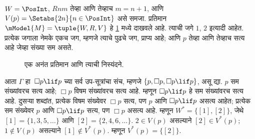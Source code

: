 \begin{ex}
  $W = \PosInt$, $Rnm$ तेव्हा आणि तेव्हाच $m = n + 1$,
  आणि $V(p) = \Setabs{2n}{n \in
    \PosInt}$ असे समजा. प्रतिमान~$\mModel{M} = \tuple{W, R, V}$
  हे \ref{nml:fil:exf:fig:ex-filtration} मध्ये दाखवले आहे.
  त्याची जगे $1$, $2$ इत्यादी आहेत. प्रत्येक जगाला
  नेमके एकच जग, म्हणजे त्याचे पुढचे जग, प्राप्य आहे;
  आणि $p$ तेव्हा आणि तेव्हाच सत्य आहे जेव्हा संख्या सम असते.

  \begin{figure}
    \centering

    \caption{एक अनंत प्रतिमान आणि त्याची निस्यंदने.}
    \label{nml:fil:exf:fig:ex-filtration}
  \end{figure}

  आता $\Gamma$ हा~$\Box p \lif p$ च्या सर्व
  उप-सूत्रांचा संच, म्हणजे
  $\{p, \Box p, \Box p \lif p\}$, असू द्या.
  $p$ सम संख्यांवरच सत्य आहे; $\Box p$ विषम
  संख्यांवरच सत्य आहे. म्हणून $\Box p \lif p$
  हे सम संख्यांवरच सत्य आहे. दुसऱ्या शब्दांत,
  प्रत्येक विषम संख्येवर $\Box p$ सत्य, पण $p$
  आणि $\Box p \lif p$ असत्य आहेत; प्रत्येक सम
  संख्येवर $p$ आणि $\Box p \lif p$ सत्य, पण
  $\Box p$ असत्य आहे. म्हणून
  $W^* = \{ [1], [2] \}$, जेथे
  $[1] = \{1, 3, 5, \dots\}$ आणि
  $[2] = \{2, 4, 6, \dots\}$.
  $2 \in V(p)$ असल्याने $[2] \in V^*(p)$;
  $1 \notin V(p)$ असल्याने $[1] \notin V^*(p)$.
  म्हणून $V^*(p) = \{[2]\}$.


\end{ex}
